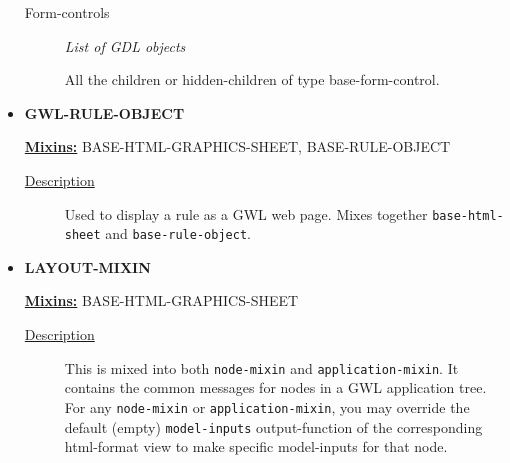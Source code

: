 \documentclass [11pt]{book}
\begin{document}
\begin{itemize}
\begin{description}
\item [Form-controls]
\emph{List of GDL objects}

 All the children or hidden-children
of type base-form-control.




\end{description}







\item {}
\label{prim:gwl-rule-object}
\textbf{GWL-RULE-OBJECT}


\textbf{
\underline{Mixins:}} BASE-HTML-GRAPHICS-SHEET, BASE-RULE-OBJECT





\begin{description}

\item [
\underline{Description}]


Used to display a rule as a GWL web page. 
Mixes together \texttt{base-html-sheet} and \texttt{base-rule-object}.



\end{description}









\item {}
\label{prim:layout-mixin}
\textbf{LAYOUT-MIXIN}


\textbf{
\underline{Mixins:}} BASE-HTML-GRAPHICS-SHEET





\begin{description}

\item [
\underline{Description}]


This is mixed into both \texttt{node-mixin} and \texttt{application-mixin}. It contains the common
messages for nodes in a GWL application tree. For any \texttt{node-mixin} or \texttt{application-mixin}, you may override the default (empty)
\texttt{model-inputs} output-function of the corresponding html-format view to make specific model-inputs for that node.



\end{description}









\end{itemize}
\end{document}
